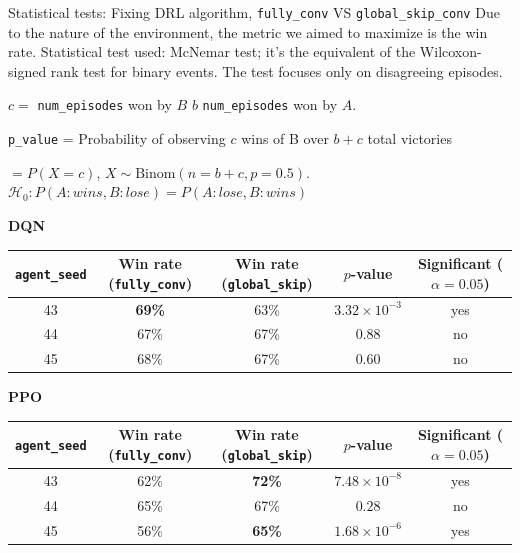\begin{frame}{Statistical tests: Fixing DRL algorithm, \texttt{fully\_conv} VS \texttt{global\_skip\_conv}}
  Due to the nature of the environment, the metric we aimed to maximize is the win rate.
  Statistical test used: McNemar test; it's the equivalent of the
  Wilcoxon-signed rank test for binary events. The test focuses only on disagreeing episodes.

  \small{$c = $ \texttt{num\_episodes} won by $B$ \hspace{1.5em} $b$ \texttt{num\_episodes} won by $A$.

    \texttt{p\_value} = Probability of observing $c$ wins of B over $b+c$ total victories

    $ = P(X=c)$, $X \sim \text{Binom}(n=b+c, p=0.5)$. $\mathcal{H}_0: P(A:wins, B:lose) = P(A:lose, B:wins)$}

  \textbf{DQN}
  \vspace{-0.2em}
  {\scriptsize
    \centering
    \setlength{\tabcolsep}{3pt}
    \renewcommand{\arraystretch}{0.85}

    \begin{tabular}{c|cccc}
      \texttt{agent\_seed}
         &
      Win rate (\texttt{fully\_conv})
         &
      Win rate (\texttt{global\_skip})
         &
      $p$-value
         &
      Significant ($\alpha=0.05$)
      \\
      \hline
      43 & \color{goodgreen}\textbf{69\%} & 63\% & $3.32 \times 10^{-3}$ & yes \\
      44 & 67\%                           & 67\% & $0.88$                & no  \\
      45 & 68\%                           & 67\% & $0.60$                & no
    \end{tabular}

    \par}
  \vspace{0.15em}

  \textbf{PPO}
  \vspace{-0.2em}
  {\scriptsize
    \centering
    \setlength{\tabcolsep}{3pt}
    \renewcommand{\arraystretch}{0.85}

    \begin{tabular}{c|cccc}
      \texttt{agent\_seed}
         &
      Win rate (\texttt{fully\_conv})
         &
      Win rate (\texttt{global\_skip})
         &
      $p$-value
         &
      Significant ($\alpha=0.05$)
      \\
      \hline
      43 & 62\% & \color{goodgreen}\textbf{72\%} & $7.48 \times 10^{-8}$ & yes \\
      44 & 65\% & 67\%                           & $0.28$                & no  \\
      45 & 56\% & \color{goodgreen}\textbf{65\%} & $1.68 \times 10^{-6}$ & yes
    \end{tabular}

    \par}
\end{frame}
